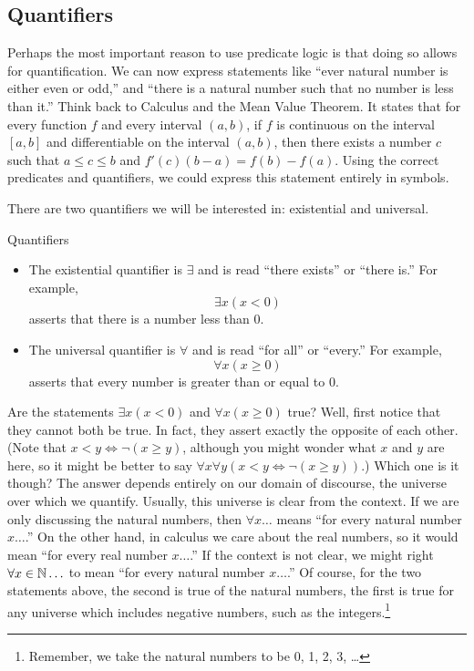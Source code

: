 \documentclass[12pt]{article}
\begin{document}
\subsection{Quantifiers}

Perhaps the most important reason to use predicate logic is that doing so allows for quantification.  We can now express statements like ``ever natural number is either even or odd,'' and ``there is a natural number such that no number is less than it.''  Think back to Calculus and the Mean Value Theorem.  It states that for every function $f$ and every interval $(a, b)$, if $f$ is continuous on the interval $[a,b]$ and differentiable on the interval $(a,b)$, then there exists a number $c$ such that $a \le c \le b$ and $f'(c)(b - a) = f(b) - f(a)$.  Using the correct predicates and quantifiers, we could express this statement entirely in symbols.

There are two quantifiers we will be interested in: existential and universal.

\begin{defbox}{Quantifiers}
  \begin{itemize}
    \item The existential quantifier is $\exists$ and is read ``there exists'' or ``there is.''  For example,
\[\exists x (x < 0)\]
asserts that there is a number less than 0.
\item The universal quantifier is $\forall$ and is read ``for all'' or ``every.''  For example,
\[\forall x (x \ge 0)\]
asserts that every number is greater than or equal to 0.
  \end{itemize}
\end{defbox}

  Are the statements $\exists x (x < 0)$ and $\forall x (x \ge 0)$ true?  Well, first notice that they cannot both be true.  In fact, they assert exactly the opposite of each other.  (Note that $x < y \iff \neg(x \ge y)$, although you might wonder what $x$ and $y$ are here, so it might be better to say $\forall x \forall y\left(x < y \iff \neg(x \ge y)\right)$.)  Which one is it though?  The answer depends entirely on our domain of discourse, the universe over which we quantify.  Usually, this universe is clear from the context.  If we are only discussing the natural numbers, then $\forall x \ldots$ means ``for every natural number $x \ldots$.''  On the other hand, in calculus we care about the real numbers, so it would mean ``for every real number $x \ldots$.''  If the context is not clear, we might right $\forall x \in \mathbb N\ldots$ to mean ``for every natural number $x\ldots$.''  Of course, for the two statements above, the second is true of the natural numbers, the first is true for any universe which includes negative numbers, such as the integers.\footnote{Remember, we take the natural
numbers to be 0, 1, 2, 3, \ldots}
\end{document}
